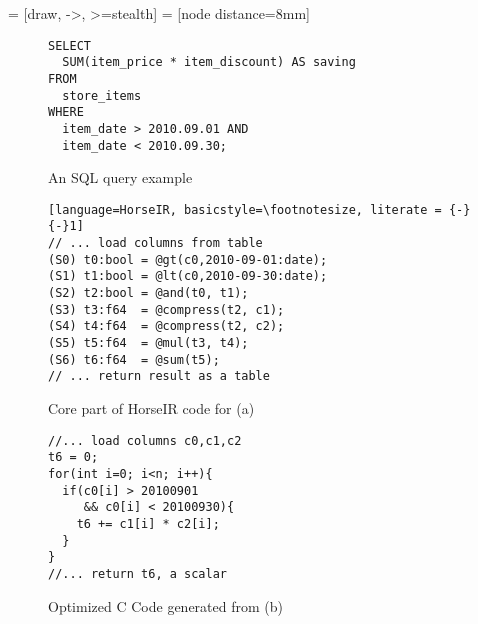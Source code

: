   = [draw, ->, >=stealth]
 = [node distance=8mm]

\begin{figure*}[htbp]

\begin{subfigure}[b]{.6\columnwidth}
\begin{lstlisting}[style=SQLStyle, basicstyle=\footnotesize]
SELECT
  SUM(item_price * item_discount) AS saving
FROM
  store_items
WHERE
  item_date > 2010.09.01 AND
  item_date < 2010.09.30;
\end{lstlisting}
\caption{An SQL query example} \label{fig:motivation_sql}
\end{subfigure}
\hfill
\begin{subfigure}[b]{.7\columnwidth}
\begin{lstlisting}[language=HorseIR, basicstyle=\footnotesize, literate = {-}{-}1]
// ... load columns from table
(S0) t0:bool = @gt(c0,2010-09-01:date);
(S1) t1:bool = @lt(c0,2010-09-30:date);
(S2) t2:bool = @and(t0, t1);
(S3) t3:f64  = @compress(t2, c1);
(S4) t4:f64  = @compress(t2, c2);
(S5) t5:f64  = @mul(t3, t4);
(S6) t6:f64  = @sum(t5);
// ... return result as a table
\end{lstlisting}
\caption{Core part of HorseIR code for (a) } \label{fig:motivation_horseir}
\end{subfigure}
\hspace{0.07\columnwidth}
\begin{subfigure}[b]{.6\columnwidth}
\centering
\begin{lstlisting}[style=CStyle, basicstyle=\footnotesize]
//... load columns c0,c1,c2
t6 = 0;
for(int i=0; i<n; i++){
  if(c0[i] > 20100901
     && c0[i] < 20100930){
    t6 += c1[i] * c2[i];
  }
}
//... return t6, a scalar
\end{lstlisting}
\caption{Optimized C Code generated from (b)} \label{fig:motivation_c}
\end{subfigure}
\caption{Translating an SQL query from (a) to the corresponding HorseIR code shown in (b) (with columns: c0 (item_date), c1 (item_price), and c2 (item_discount)), and generating optimized C code in (c).} \label{fig:motivation_example}
\end{figure*}
